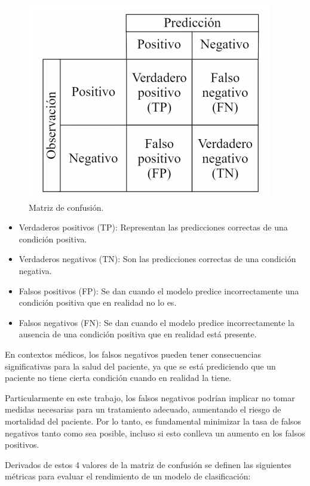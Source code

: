 \begin{figure}[htpb]
\centering 
\includegraphics[width=.75\textwidth]{./Figures/MatrizDeConfusion.png}
\caption{Matriz de confusión.}
\label{fig:MatrizConfusion}
\end{figure}

\begin{itemize}
\item Verdaderos positivos (TP): Representan las predicciones correctas de una condición positiva.
\item Verdaderos negativos (TN): Son las predicciones correctas de una condición negativa.
\item Falsos positivos (FP): Se dan cuando el modelo predice incorrectamente una condición positiva que en realidad no lo es.
\item Falsos negativos (FN): Se dan cuando el modelo predice incorrectamente la ausencia de una condición positiva que en realidad está presente.
\end{itemize}

En contextos médicos, los falsos negativos pueden tener consecuencias significativas para la salud del paciente, ya que se está prediciendo que un paciente no tiene cierta condición cuando en realidad la tiene. 

Particularmente en este trabajo, los falsos negativos podrían implicar no tomar medidas necesarias para un tratamiento adecuado, aumentando el riesgo de mortalidad del paciente. Por lo tanto, es fundamental minimizar la tasa de falsos negativos tanto como sea posible, incluso si esto conlleva un aumento en los falsos positivos. 

Derivados de estos 4 valores de la matriz de confusión se definen las siguientes métricas para evaluar el rendimiento de un modelo de clasificación:

